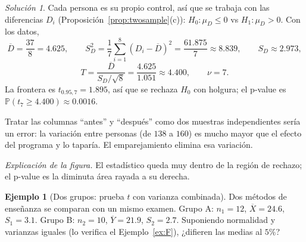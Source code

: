\documentclass[11pt]{article}
\theoremstyle{plain}
\theoremstyle{definition}
\newtheorem{example}[theorem]{Ejemplo}
\theoremstyle{remark}
\theoremstyle{solstyle}
\newtheorem*{solution}{Solución}
\newcommand{\Pbb}{\mathbb{P}}
\newcommand{\1}{\mathbbm{1}}
\newcommand{\Xbar}{\overline{X}}
\newcommand{\Ybar}{\overline{Y}}
\begin{document}
\begin{solution}
Cada persona es su propio control, así que se trabaja con las diferencias $D_i$ (Proposición~\ref{prop:twosample}(c)): $H_0:\mu_D\le0$ vs $H_1:\mu_D>0$. Con los datos,
\[
\overline D=\frac{37}{8}=4.625,\qquad
S_D^2=\frac{1}{7}\sum_{i=1}^8(D_i-\overline D)^2=\frac{61.875}{7}\approx8.839,\qquad S_D\approx2.973,
\]
\[
T=\frac{\overline D}{S_D/\sqrt8}=\frac{4.625}{1.051}\approx4.400,\qquad \nu=7 .
\]
La frontera es $t_{0.95,7}=1.895$, así que se rechaza $H_0$ con holgura; el p-value es $\Pbb(t_7\ge4.400)\approx0.0016$.

Tratar las columnas ``antes'' y ``después'' como dos muestras independientes sería un error: la variación entre personas (de $138$ a $160$) es mucho mayor que el efecto del programa y lo taparía. El emparejamiento elimina esa variación.
\end{solution}

\begin{center}
\end{center}

\noindent\textit{Explicación de la figura.} El estadístico queda muy dentro de la región de rechazo; el p-value es la diminuta área rayada a su derecha.

\begin{example}[Dos grupos: prueba $t$ con varianza combinada]\label{ex:pooled}
Dos métodos de enseñanza se comparan con un mismo examen. Grupo A: $n_1=12$, $\Xbar=24.6$, $S_1=3.1$. Grupo B: $n_2=10$, $\Ybar=21.9$, $S_2=2.7$. Suponiendo normalidad y varianzas iguales (lo verifica el Ejemplo~\ref{ex:F}), ¿difieren las medias al $5\%$?
\end{example}
\end{document}
